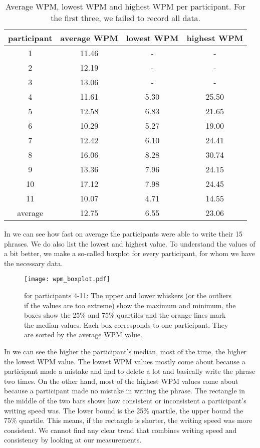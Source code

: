 \begin{table}[ht!]
    \centering
    \caption{Average WPM, lowest WPM and highest WPM per participant. For the first three, we failed to record all data.}
    \begin{tabular}{cccc} \toprule
        participant&average WPM&lowest WPM&highest WPM\\ \midrule
        1 & 11.46 & - & -\\ 
        2 & 12.19 & - & -\\
        3 & 13.06 & - & -\\ 
        4 & 11.61 & 5.30 & 25.50\\
        5 & 12.58 & 6.83 & 21.65\\
        6 & 10.29 & 5.27 & 19.00\\
        7 & 12.42 & 6.10 & 24.41\\
        8 & 16.06 & 8.28 & 30.74\\
        9 & 13.36 & 7.96 & 24.15\\
        10 & 17.12 & 7.98 & 24.45\\
        11 & 10.07 & 4.71 & 14.55\\
        \midrule
        average&12.75&6.55&23.06\\
        \bottomrule
    \end{tabular}
    \label{tab:WPM}
\end{table}
In  we can see how fast on average the participants were able to write their 15 phrases. We do also list the lowest and highest value. To understand the values of  a bit better, we make a so-called boxplot for every participant, for whom we have the necessary data.
\begin{figure}[H]
    \centering
    \texttt{[image: wpm\_boxplot.pdf]}
    \caption{for participants 4-11: The upper and lower whiskers (or the outliers if the values are too extreme) show the maximum and minimum, the boxes show the 25\% and 75\% quartiles and the orange lines mark the median values. Each box corresponds to one participant. They are sorted by the average WPM value.}
    \label{fig:WPM}
\end{figure}
In  we can see the higher the participant's median, most of the time, the higher the lowest WPM value. The lowest WPM values mostly come about because a participant made a mistake and had to delete a lot and basically write the phrase two times. On the other hand, most of the highest WPM values come about because a participant made no mistake in writing the phrase. The rectangle in the middle of the two bars shows how consistent or inconsistent a participant's writing speed was. The lower bound is the 25\% quartile, the upper bound the 75\% quartile. This means, if the rectangle is shorter, the writing speed was more consistent. We cannot find any clear trend that combines writing speed and consistency by looking at our measurements.\\
